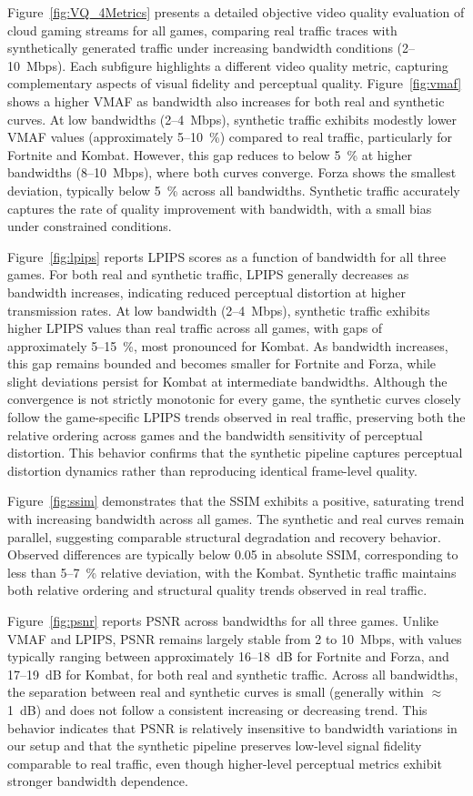 Figure~\ref{fig:VQ_4Metrics} presents a detailed objective video quality evaluation of cloud gaming streams for all games, comparing real traffic traces with synthetically generated traffic under increasing bandwidth conditions (2–10~Mbps). Each subfigure highlights a different video quality metric, capturing complementary aspects of visual fidelity and perceptual quality. 
%
Figure~\ref{fig:vmaf} shows a higher VMAF as bandwidth also increases for both real and synthetic curves.
%
At low bandwidths (2–4~Mbps), synthetic traffic exhibits modestly lower VMAF values (approximately 5–10~\%) compared to real traffic, particularly for Fortnite and Kombat. However, this gap reduces to below 5~\% at higher bandwidths (8–10~Mbps), where both curves converge. Forza shows the smallest deviation, typically below 5~\% across all bandwidths. Synthetic traffic accurately captures the rate of quality improvement with bandwidth, with a small bias under constrained conditions.

Figure~\ref{fig:lpips} reports LPIPS scores as a function of bandwidth for all three games. 
For both real and synthetic traffic, LPIPS generally decreases as bandwidth increases, indicating reduced perceptual distortion at higher transmission rates. At low bandwidth (2–4~Mbps), synthetic traffic exhibits higher LPIPS values than real traffic across all games, with gaps of approximately 5–15~\%, most pronounced for Kombat. As bandwidth increases, this gap remains bounded and becomes smaller for Fortnite and Forza, while slight deviations persist for Kombat at intermediate bandwidths. Although the convergence is not strictly monotonic for every game, the synthetic curves closely follow the game-specific LPIPS trends observed in real traffic, preserving both the relative ordering across games and the bandwidth sensitivity of perceptual distortion. This behavior confirms that the synthetic pipeline captures perceptual distortion dynamics rather than reproducing identical frame-level quality.


Figure~\ref{fig:ssim} demonstrates that the SSIM exhibits a positive, saturating trend with increasing bandwidth across all games. The synthetic and real curves remain parallel, suggesting comparable structural degradation and recovery behavior. Observed differences are typically below 0.05 in absolute SSIM, corresponding to less than 5–7~\% relative deviation, with the Kombat. Synthetic traffic maintains both relative ordering and structural quality trends observed in real traffic.

Figure~\ref{fig:psnr} reports PSNR across bandwidths for all three games. 
Unlike VMAF and LPIPS, PSNR remains largely stable from 2 to 10~Mbps, with values typically ranging between approximately 16–18~dB for Fortnite and Forza, and 17–19~dB for Kombat, for both real and synthetic traffic. 
Across all bandwidths, the separation between real and synthetic curves is small (generally within $\approx$1~dB) and does not follow a consistent increasing or decreasing trend. 
This behavior indicates that PSNR is relatively insensitive to bandwidth variations in our setup and that the synthetic pipeline preserves low-level signal fidelity comparable to real traffic, even though higher-level perceptual metrics exhibit stronger bandwidth dependence.


